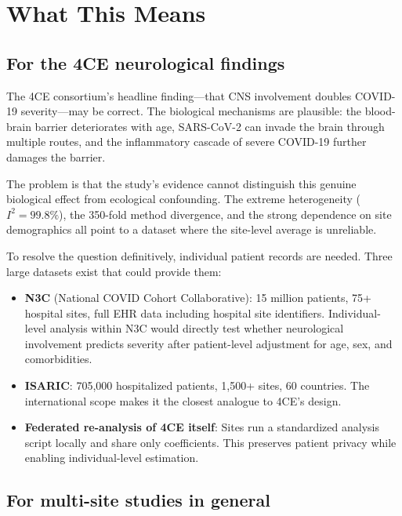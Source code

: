 \documentclass{article}
\begin{document}
\section{What This Means}

\subsection{For the 4CE neurological findings}

The 4CE consortium's headline finding---that CNS involvement doubles
COVID-19 severity---may be correct.  The biological mechanisms are plausible:
the blood-brain barrier deteriorates with age, SARS-CoV-2 can invade the
brain through multiple routes, and the inflammatory cascade of severe COVID-19
further damages the barrier.

The problem is that the study's evidence cannot distinguish this genuine
biological effect from ecological confounding.  The extreme heterogeneity
($I^2 = 99.8\%$), the 350-fold method divergence, and the strong dependence
on site demographics all point to a dataset where the site-level average is
unreliable.

To resolve the question definitively, individual patient records are needed.
Three large datasets exist that could provide them:

\begin{itemize}
\item \textbf{N3C} (National COVID Cohort Collaborative): 15 million patients,
75+ hospital sites, full EHR data including hospital site identifiers.
Individual-level analysis within N3C would directly test whether neurological
involvement predicts severity after patient-level adjustment for age, sex,
and comorbidities.

\item \textbf{ISARIC}: 705,000 hospitalized patients, 1,500+ sites, 60
countries.  The international scope makes it the closest analogue to 4CE's
design.

\item \textbf{Federated re-analysis of 4CE itself}: Sites run a standardized
analysis script locally and share only coefficients.  This preserves patient
privacy while enabling individual-level estimation.
\end{itemize}


\subsection{For multi-site studies in general}
\end{document}
